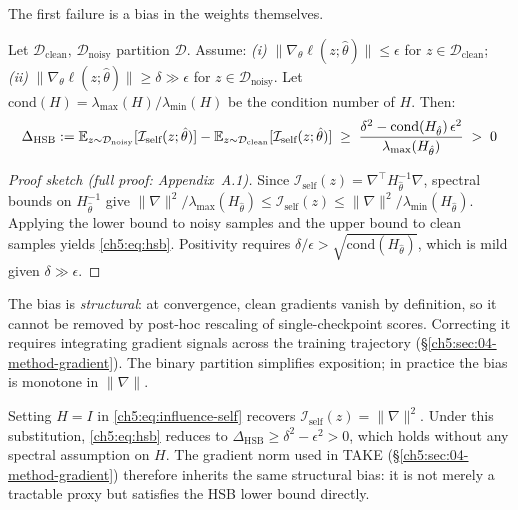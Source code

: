 \begin{foldable} %
    The first failure is a bias in the weights themselves.
    \begin{proposition}
        Let $\mathcal{D}_\text{clean},\, \mathcal{D}_\text{noisy}$ partition $\mathcal{D}$.
        Assume: \emph{(i)} $\|\nabla_\theta \ell(z; \hat{\theta})\| \leq \epsilon$ for $z \in \mathcal{D}_\text{clean}$;
        \emph{(ii)} $\|\nabla_\theta \ell(z; \hat{\theta})\| \geq \delta \gg \epsilon$ for $z \in \mathcal{D}_\text{noisy}$.
        Let $\mathrm{cond}(H) = \lambda_{\max}(H) / \lambda_{\min}(H)$ be the condition number of $H$.
        Then:
        \begin{equation}
            \Delta_\textup{HSB} := \mathbb{E}_{z \sim \mathcal{D}_\textup{noisy}}[\mathcal{I}_\textup{self}(z;\hat{\theta})]
            - \mathbb{E}_{z \sim \mathcal{D}_\textup{clean}}[\mathcal{I}_\textup{self}(z;\hat{\theta})]
            \;\geq\; \frac{\delta^2 - \mathrm{cond}(H_{\hat{\theta}})\,\epsilon^2}{\lambda_{\max}(H_{\hat{\theta}})}
            \;>\; 0
            \label{ch5:eq:hsb}
        \end{equation}
    \end{proposition}
    \begin{proof}[Proof sketch (full proof: Appendix~A.1)]
        Since $\mathcal{I}_\text{self}(z) = \nabla^\top H_{\hat\theta}^{-1} \nabla$, spectral bounds on $H_{\hat\theta}^{-1}$ give
        $\|\nabla\|^2/\lambda_{\max}(H_{\hat\theta}) \leq \mathcal{I}_\text{self}(z) \leq \|\nabla\|^2/\lambda_{\min}(H_{\hat\theta})$.
        Applying the lower bound to noisy samples and the upper bound to clean samples yields \eqref{ch5:eq:hsb}.
        Positivity requires $\delta/\epsilon > \sqrt{\mathrm{cond}(H_{\hat\theta})}$, which is mild given $\delta \gg \epsilon$.
    \end{proof}
    The bias is \emph{structural}: at convergence, clean gradients vanish by definition, so it cannot be removed by post-hoc rescaling of single-checkpoint scores.
    Correcting it requires integrating gradient signals across the training trajectory (\S\ref{ch5:sec:04-method-gradient}).
    The binary partition simplifies exposition; in practice the bias is monotone in $\|\nabla\|$.
    \begin{remark}
        Setting $H = I$ in \eqref{ch5:eq:influence-self} recovers $\mathcal{I}_\text{self}(z) = \|\nabla\|^2$.
        Under this substitution, \eqref{ch5:eq:hsb} reduces to $\Delta_\text{HSB} \geq \delta^2 - \epsilon^2 > 0$, which holds without any spectral assumption on $H$.
        The gradient norm used in TAKE (\S\ref{ch5:sec:04-method-gradient}) therefore inherits the same structural bias: it is not merely a tractable proxy but satisfies the HSB lower bound directly.
    \end{remark}
\end{foldable}

